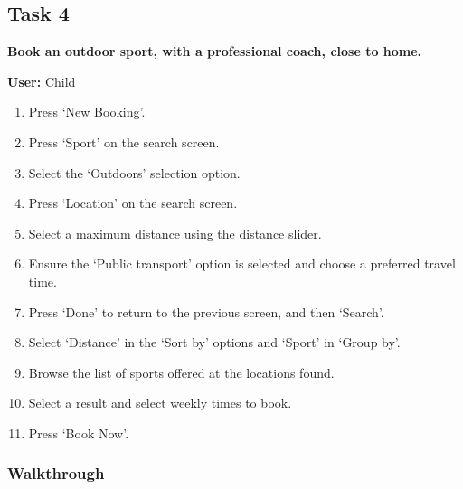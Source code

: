 \subsection{Task 4}
\label{ssub:task_4}

\textbf{Book an outdoor sport, with a professional coach, close to home.}

\textbf{User:} Child
\begin{enumerate}
	\item Press `New Booking'.
	\item Press `Sport' on the search screen.
	\item Select the `Outdoors' selection option.
	\item Press `Location' on the search screen.
	\item Select a maximum distance using the distance slider.
	\item Ensure the `Public transport' option is selected and choose a
		preferred travel time.
	\item Press `Done' to return to the previous screen, and then `Search'.
	\item Select `Distance' in the `Sort by' options and `Sport' in `Group by'.
	\item Browse the list of sports offered at the locations found.
	\item Select a result and select weekly times to book.
	\item Press `Book Now'.
\end{enumerate}

\subsubsection{Walkthrough}

